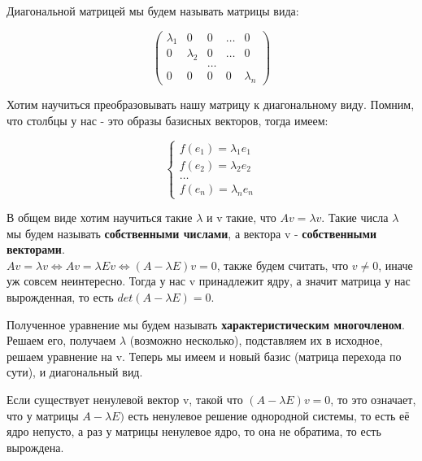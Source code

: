 \documentclass[12pt]{article}
\begin{document}
\begin{definitionbox}
    Диагональной матрицей мы будем называть матрицы вида:

    \[
        \begin{pmatrix}
            \lambda_1 &0 & 0 & \dots & 0 \\
            0 & \lambda_2 & 0 & \dots & 0 \\
            & &\dots \\
            0 & 0 & 0 & 0 & \lambda_n
        \end{pmatrix}
    \]
\end{definitionbox}

\begin{definitionbox}
    Хотим научиться преобразовывать нашу матрицу к диагональному виду. Помним, что столбцы у нас - это образы базисных векторов, тогда имеем:

    \[
        \begin{cases}
            f(e_1) = \lambda_1 e_1 \\
            f(e_2) = \lambda_2 e_2 \\
            \dots \\ 
            f(e_n) = \lambda_n e_n
        \end{cases}
    \]

    В общем виде хотим научиться такие $\lambda$ и v такие, что $Av = \lambda v$. Такие числа $\lambda$ мы будем называть \textbf{собственными числами}, а вектора v - \textbf{собственными векторами}.\\

    $Av = \lambda v \Leftrightarrow Av = \lambda Ev \Leftrightarrow (A - \lambda E)v = 0$, также будем считать, что $v \neq 0$, иначе уж совсем неинтересно. Тогда у нас v принадлежит ядру, а значит матрица у нас вырожденная, то есть $det(A - \lambda E) = 0$.

    Полученное уравнение мы будем называть \textbf{характеристическим многочленом}. Решаем его, получаем $\lambda$ (возможно несколько), подставляем их в исходное, решаем уравнение на v. Теперь мы имеем и новый базис (матрица перехода по сути), и диагональный вид.
\end{definitionbox}

\begin{remarkbox}
    Если существует ненулевой вектор v, такой что $(A - \lambda E)v = 0$, то это означает, что у матрицы $A - \lambda E)$ есть ненулевое решение однородной системы, то есть её ядро непусто, а раз у матрицы ненулевое ядро, то она не обратима, то есть вырождена.
\end{remarkbox}
\end{document}
